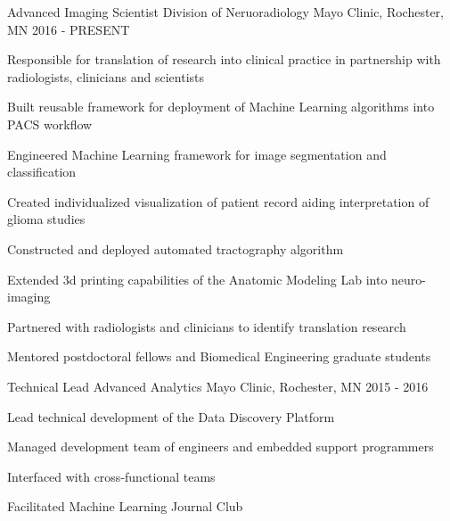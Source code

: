 

\begin{cventries}
  \cventry
      {Advanced Imaging Scientist} %
      {Division of Neruoradiology} %
      {Mayo Clinic, Rochester, MN} %
      {2016 - PRESENT} %
      {
        \begin{cvitems}
        \item Responsible for translation of research into clinical practice in partnership with radiologists, clinicians and scientists
        \item Built reusable framework for deployment of Machine Learning algorithms into PACS workflow
        \item Engineered Machine Learning framework for image segmentation and classification
        \item Created individualized visualization of patient record aiding interpretation of glioma studies
        \item Constructed and deployed automated tractography algorithm
        \item Extended 3d printing capabilities of the Anatomic Modeling Lab into neuro-imaging
        \item Partnered with radiologists and clinicians to identify translation research
        \item Mentored postdoctoral fellows and Biomedical Engineering graduate students
        \end{cvitems}
      }
      
  \cventry
      {Technical Lead} %
      {Advanced Analytics} %
      {Mayo Clinic, Rochester, MN} %
      {2015 - 2016} %
      { 
        \begin{cvitems}
        \item{Lead technical development of the Data Discovery Platform}
        \item{Managed development team of engineers and embedded support programmers}
        \item{Interfaced with cross-functional teams}
        \item{Facilitated Machine Learning Journal Club}
        \end{cvitems}
      }
      

\end{cventries}
